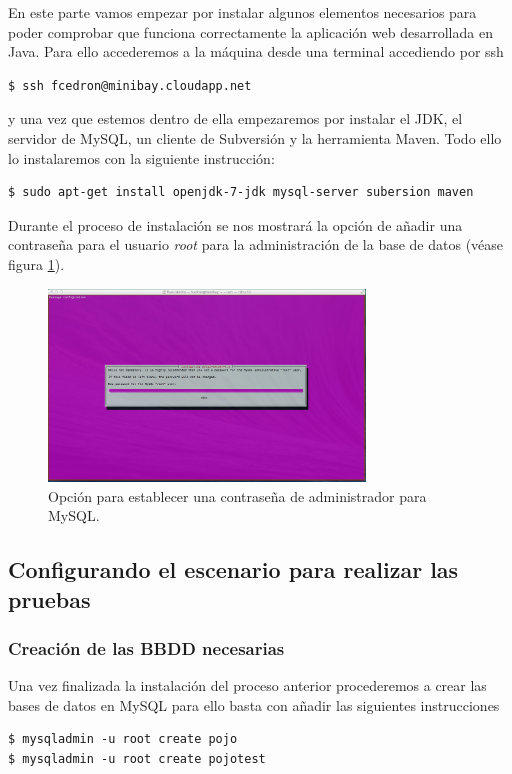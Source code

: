 \documentclass{article}
\begin{document}
	En este parte vamos empezar por instalar algunos elementos necesarios para poder comprobar que funciona correctamente la aplicación web desarrollada en Java. Para ello accederemos a la máquina desde una terminal accediendo por ssh
\begin{lstlisting}[style=miniBash]
$ ssh fcedron@minibay.cloudapp.net
\end{lstlisting}
y una vez que estemos dentro de ella empezaremos por instalar el JDK, el servidor de MySQL, un cliente de Subversión y la herramienta Maven. Todo ello lo instalaremos con la siguiente instrucción:
\begin{lstlisting}[style=miniBash]
$ sudo apt-get install openjdk-7-jdk mysql-server subersion maven
\end{lstlisting}
	Durante el proceso de instalación se nos mostrará la opción de añadir una contraseña para el usuario \emph{root} para la administración de la base de datos (véase figura \ref{fig:setPassRootMySQL}).

\begin{figure}[h]
  \centering
    \includegraphics[width=0.75\textwidth]{img/m_p011.png}
  \caption{Opción para establecer una contraseña de administrador para MySQL.}
  \label{fig:setPassRootMySQL}
\end{figure}

\subsection{Configurando el escenario para realizar las pruebas}

\subsubsection{Creación de las BBDD necesarias}
	Una vez finalizada la instalación del proceso anterior procederemos a crear las bases de datos en MySQL para ello basta con añadir las siguientes instrucciones
\begin{lstlisting}[style=miniBash]
$ mysqladmin -u root create pojo
$ mysqladmin -u root create pojotest
\end{lstlisting}
\end{document}
